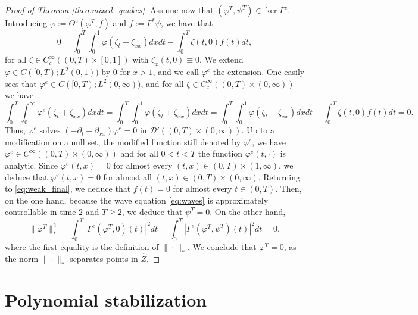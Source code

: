 \documentclass[10pt]{article}
\newcommand{\opker}{\operatorname{ker}}
\begin{document}
\begin{proof}[Proof of Theorem \ref{theo:mixed_quakes}]
Assume now that $(\varphi^T,\psi^T) \in \opker \Gamma^e$. Introducing $\varphi := \Theta^e(\varphi^T,f)$ and $f := F^*\psi$, we have that
\begin{equation}\label{eq:weak_final}
0 = \int_0^T \int_0^1 \varphi (\zeta_t + \zeta_{xx}) dxdt - \int_0^T  \zeta(t,0)f(t) dt,  
\end{equation}
for all $\zeta \in C_c^\infty((0,T) \times [0,1])$ with $\zeta_x(t,0) \equiv 0$. We extend $\varphi \in C([0,T) ; L^2(0,1))$ by $0$ for $x > 1$, and we call $\varphi^e$ the extension. One easily sees that $\varphi^e \in C([0,T) ; L^2(0,\infty))$, and for all $\zeta \in C_c^\infty((0,T) \times (0,\infty))$ we have 
\[
\int_0^T \int_0^\infty \varphi^e (\zeta_t + \zeta_{xx}) dxdt = \int_0^T \int_0^1 \varphi (\zeta_t + \zeta_{xx}) dxdt = \int_0^T \int_0^1 \varphi (\zeta_t + \zeta_{xx}) dxdt - \int_0^T \zeta(t,0)f(t)  dt = 0.
\]
Thus, $\varphi^e$ solves $(-\partial_t - \partial_{xx})\varphi^e = 0$ in $\mathcal{D}'((0,T) \times (0,\infty))$. Up to a modification on a null set, the modified function still denoted by $\varphi^e$, we have $\varphi^e \in C^\infty((0,T) \times (0,\infty))$ and for all $0 < t < T$ the function $\varphi^e(t,\cdot)$ is analytic. Since $\varphi^e(t,x) = 0$ for almost every $(t,x) \in (0,T) \times (1,\infty)$, we deduce that $\varphi^e(t,x) = 0$ for almost all $(t,x) \in (0,T) \times (0,\infty)$. Returning to \eqref{eq:weak_final}, we deduce that $f(t) = 0$ for almost every $t \in (0,T)$. Then, on the one hand, because the wave equation \eqref{eq:waves} is approximately controllable in time $2$ and $T \geq 2$, we deduce that $\psi^T = 0$. On the other hand, 
\[
\| \varphi^T \|_*^2 = \int_0^T |\Gamma^e(\varphi^T,0)(t)|^2dt = \int_0^T |\Gamma^e(\varphi^T,\psi^T)(t)|^2dt = 0,
\]
where the first equality is the definition of $\| \cdot \|_*$. We conclude that $\varphi^T = 0$, as the norm $\| \cdot \|_*$ separates points in $\hat{Z}$.
\end{proof}
\section{Polynomial stabilization} \label{sec:pol}
\end{document}
